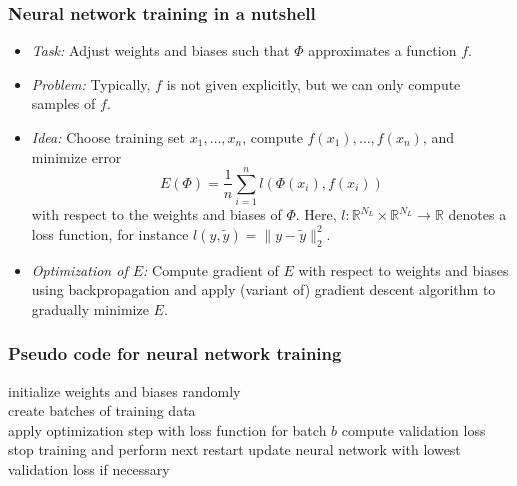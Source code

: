 \documentclass[%
]{beamer}
\begin{document}
\begin{frame}[fragile]
	\frametitle{Neural network training in a nutshell}
	\begin{itemize}
		\item \emph{Task:} Adjust weights and biases such that $\Phi$ approximates a function $f$.
		\item \emph{Problem:} Typically, $f$ is not given explicitly, but we can only compute samples of $f$.
		\item<2-> \emph{Idea:} Choose training set $x_1,\dots,x_n$, compute $f(x_1),\dots,f(x_n)$, and minimize error
		\[
			E(\Phi) = \frac{1}{n}\sum\limits_{i=1}^{n}l(\Phi(x_i),f(x_i))
		\]
		with respect to the weights and biases of $\Phi$.\newline
		Here, $l\colon\mathbb{R}^{N_L}\times\mathbb{R}^{N_L}\to\mathbb{R}$ denotes a loss function, for instance $l(y,\tilde{y})=\lVert y-\tilde{y}\rVert_2^2$.
		\item<2-> \emph{Optimization of $E$:} Compute gradient of $E$ with respect to weights and biases using backpropagation and apply (variant of) gradient descent algorithm to gradually minimize $E$.
	\end{itemize}
\end{frame}
\begin{frame}[fragile]
	\frametitle{Pseudo code for neural network training}
	\IncMargin{1.5em}
	\begin{algorithm}[H]
		\SetAlgoLined
		\SetNoFillComment
		{
			initialize weights and biases randomly\\
			{
				create batches of training data\\
				{
					apply optimization step with loss function for batch $b$
				}
				compute validation loss\\
				{
					stop training and perform next restart
				}
			}
			update neural network with lowest validation loss if necessary
		}
	\end{algorithm}
	\DecMargin{1.5em}
\end{frame}
\end{document}
